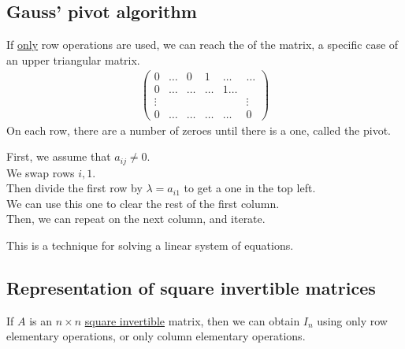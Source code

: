 \subsection{Gauss' pivot algorithm}
If \underline{only} row operations are used, we can reach the  of the matrix, a specific case of an upper triangular matrix.
\begin{align*}
    \begin{pmatrix}0 & \dots & 0 & 1 & \dots & \dots \\ 0 & \dots & \dots & \dots & 1 \dots \\ \vdots &  &  &  & & \vdots \\ 0 & \dots & \dots & \dots & \dots & 0 \end{pmatrix}
\end{align*} 
On each row, there are a number of zeroes until there is a one, called the pivot.

First, we assume that $a_{ij} \neq 0$. \\
We swap rows $i, 1$. \\
Then divide the first row by $\lambda = a_{i1}$ to get a one in the top left. \\
We can use this one to clear the rest of the first column. \\
Then, we can repeat on the next column, and iterate.

This is a technique for solving a linear system of equations.

\subsection{Representation of square invertible matrices}
\begin{lemma}
    If $A$ is an $n \times n$ \underline{square invertible} matrix, then we can obtain $I_n$ using only row elementary operations, or only column elementary operations.
\end{lemma}

